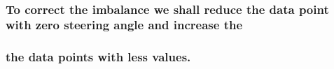 \documentclass[11pt]{article}
\begin{document}
    \begin{center}
    \end{center}
    { \hspace*{\fill} \\}
    
    \hypertarget{to-correct-the-imbalance-we-shall-reduce-the-data-point-with-zero-steering-angle-and-increase-the}{%
\subsubsection{To correct the imbalance we shall reduce the data point
with zero steering angle and increase
the}\label{to-correct-the-imbalance-we-shall-reduce-the-data-point-with-zero-steering-angle-and-increase-the}}

\hypertarget{the-data-points-with-less-values.}{%
\subsubsection{the data points with less
values.}\label{the-data-points-with-less-values.}}
\end{document}
